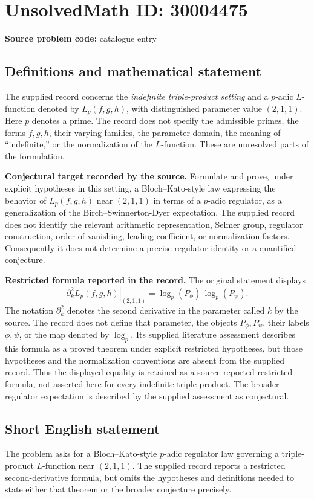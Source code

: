\documentclass[11pt]{article}
\begin{document}
\section*{UnsolvedMath ID: 30004475}
\textbf{Source problem code:} catalogue entry
\subsection{Definitions and mathematical statement}
The supplied record concerns the \emph{indefinite triple-product setting} and a \(p\)-adic \(L\)-function denoted by \(L_p(f,g,h)\), with distinguished parameter value \((2,1,1)\). Here \(p\) denotes a prime. The record does not specify the admissible primes, the forms \(f,g,h\), their varying families, the parameter domain, the meaning of ``indefinite,'' or the normalization of the \(L\)-function. These are unresolved parts of the formulation.

\textbf{Conjectural target recorded by the source.} Formulate and prove, under explicit hypotheses in this setting, a Bloch--Kato-style law expressing the behavior of \(L_p(f,g,h)\) near \((2,1,1)\) in terms of a \(p\)-adic regulator, as a generalization of the Birch--Swinnerton-Dyer expectation. The supplied record does not identify the relevant arithmetic representation, Selmer group, regulator construction, order of vanishing, leading coefficient, or normalization factors. Consequently it does not determine a precise regulator identity or a quantified conjecture.

\textbf{Restricted formula reported in the record.} The original statement displays
\[
\left.\partial_k^2 L_p(f,g,h)\right|_{(2,1,1)}
=\log_p(P_\phi)\,\log_p(P_\psi).
\]
The notation \(\partial_k^2\) denotes the second derivative in the parameter called \(k\) by the source. The record does not define that parameter, the objects \(P_\phi,P_\psi\), their labels \(\phi,\psi\), or the map denoted by \(\log_p\). Its supplied literature assessment describes this formula as a proved theorem under explicit restricted hypotheses, but those hypotheses and the normalization conventions are absent from the supplied record. Thus the displayed equality is retained as a source-reported restricted formula, not asserted here for every indefinite triple product. The broader regulator expectation is described by the supplied assessment as conjectural.
\subsection{Short English statement}
The problem asks for a Bloch--Kato-style \(p\)-adic regulator law governing a triple-product \(L\)-function near \((2,1,1)\). The supplied record reports a restricted second-derivative formula, but omits the hypotheses and definitions needed to state either that theorem or the broader conjecture precisely.
\end{document}
